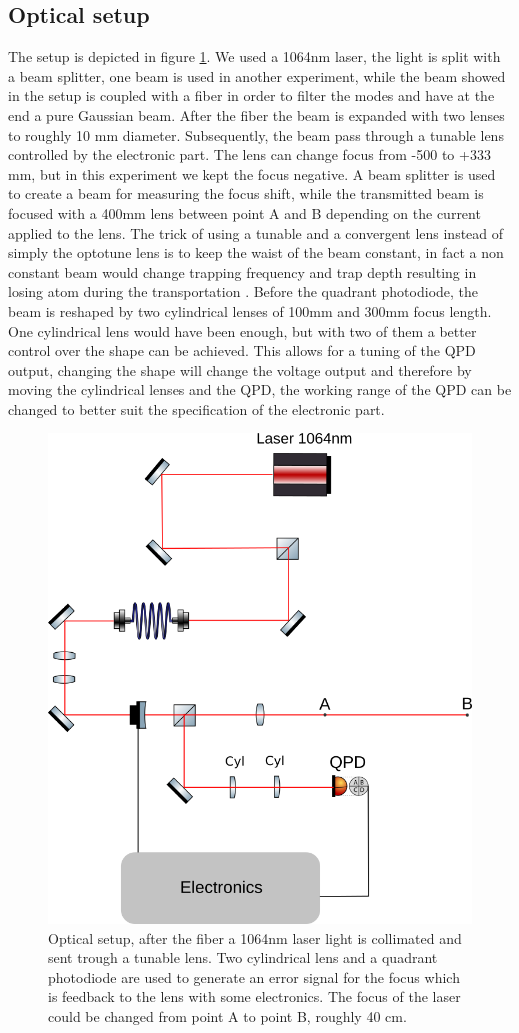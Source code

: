 \documentclass[a4paper,10pt]{article}
\begin{document}
\subsection{Optical setup}
The setup is depicted in figure \ref{img:opticsetup}. We used a 1064nm laser, the light is split with a beam splitter, one beam is used in another experiment, while the beam showed in the setup is coupled with a fiber in order to filter the modes and have at the end a pure Gaussian beam. After the fiber the beam is expanded with two lenses to roughly 10 mm diameter. Subsequently, the beam pass through a tunable lens controlled by the electronic part. The lens can change focus from  -500 to +333 mm, but in this experiment we kept the focus negative. A beam splitter is used to create a beam for measuring the focus shift, while the transmitted beam is focused with a 400mm lens between point A and B depending on the current applied to the lens. The trick of using a tunable and a convergent lens instead of simply the optotune lens is to keep the waist of the beam constant, in fact a non constant beam would change trapping frequency and trap depth resulting in losing atom during the transportation \cite{opticaltransportation}.  Before the quadrant photodiode, the beam is reshaped by two cylindrical lenses of 100mm and 300mm focus length. One cylindrical lens would have been enough, but with two of them a better control over the shape can be achieved. This allows for a tuning of the QPD output, changing the shape will change the voltage output and therefore by moving the cylindrical lenses and the QPD, the working range of the QPD can be changed to better suit the specification of the electronic part.
\begin{figure}[H]
\centering
\includegraphics[width = .5\textwidth]{opticsetup}
\caption{Optical setup, after the fiber a 1064nm laser light is collimated and sent trough a tunable lens. Two cylindrical lens and a quadrant photodiode are used to generate an error signal for the focus which is feedback to the lens with some electronics. The focus of the laser could be changed from point A to point B, roughly 40 cm.} \label{img:opticsetup}
\end{figure}
\end{document}
